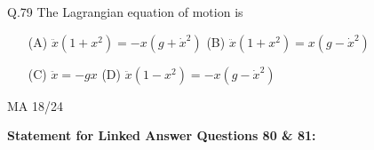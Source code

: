 \documentclass{article}
\begin{document}
																																																																																																																						   Q.79 \quad The Lagrangian equation of motion is
																																																																																																																						   \begin{itemize}
																																																																																																																						       \item[(A)] $\ddot{x}(1 + x^2) = -x(g + \dot{x}^2)$ \hspace{3cm} (B) $\ddot{x}(1 + x^2) = x(g - \dot{x}^2)$
																																																																																																																						          
																																																																																																																							      \item[(C)] $\ddot{x} = -g x$ \hspace{5cm} (D) $\ddot{x}(1 - x^2) = -x(g - \dot{x}^2)$
																																																																																																																							          
																																																																																																																								  \end{itemize}
																																																																																																																								  \vspace{10em}
																																																																																																																								  \begin{center}
																																																																																																																								      {MA 18/24}
																																																																																																																								      \end{center}
																																																																																																																								      \newpage



																																																																																																																								      \textbf{Statement for Linked Answer Questions 80 \& 81:}
\end{document}
